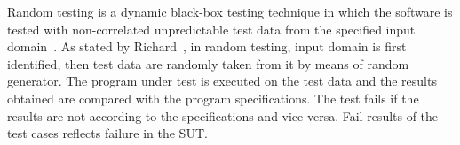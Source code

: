 

Random testing is a dynamic black-box testing technique in which the software is tested with non-correlated unpredictable test data from the specified input domain~\cite{chan2003normalized}. As stated by Richard~\cite{hamlet1994random}, in random testing, input domain is first identified, then test data are randomly taken from it by means of random generator. The program under test is executed on the test data and the results obtained are compared with the program specifications. The test fails if the results are not according to the specifications and vice versa. Fail results of the test cases reflects failure in the SUT.

